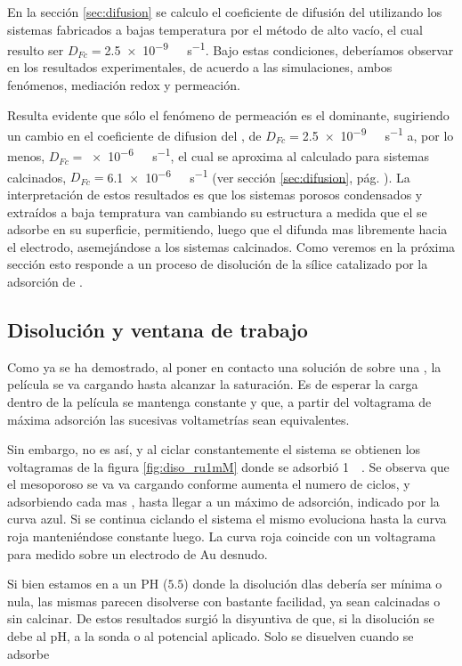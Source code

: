 		En la sección \ref{sec:difusion} se calculo el coeficiente de difusión del \fc\space utilizando los sistemas fabricados a bajas temperatura por el método de alto vacío, el cual resulto ser $D_{Fc}=$\SI{2.5e-9}{\per\Molar\per\second}. Bajo estas condiciones, deberíamos observar en los resultados experimentales, de acuerdo a las simulaciones, ambos fenómenos, mediación redox y permeación.

		Resulta evidente que sólo el fenómeno de permeación es el dominante, sugiriendo un cambio en el coeficiente de difusion del \fc, de $D_{Fc}=$\SI{2.5e-9}{\per\Molar\per\second} a, por lo menos, $D_{Fc}=$\SI{e-6}{\per\Molar\per\second}, el cual se aproxima al calculado para sistemas calcinados,  $D_{Fc}=$\SI{6.1e-6}{\per\Molar\per\second} (ver sección \ref{sec:difusion}, pág. \pageref{sec:difusion}). La interpretación de estos resultados es que los sistemas porosos condensados y extraídos a baja tempratura van cambiando su estructura a medida que el \ru\space se adsorbe en su superficie, permitiendo, luego que el \fc\space difunda mas libremente hacia el electrodo, asemejándose a los sistemas calcinados. Como veremos en la próxima sección esto responde a un proceso de disolución de la sílice catalizado por la adsorción de \aminorutenio.

	\subsection{Disolución y ventana de trabajo}

		Como ya se ha demostrado, al poner en contacto una solución de \ru\space sobre una \pdmF\space, la película se va cargando hasta alcanzar la saturación. Es de esperar la carga dentro de la película se mantenga constante y que, a partir del voltagrama de máxima adsorción las sucesivas voltametrías sean equivalentes.

		Sin embargo, no es así, y al ciclar constantemente el sistema se obtienen los voltagramas de la figura \ref{fig:diso_ru1mM} donde se adsorbió \ru\space \SI{1}{\milli\Molar}. Se observa que el mesoporoso se va va cargando conforme aumenta el numero de ciclos, y adsorbiendo cada mas \ru\space, hasta llegar a un máximo de adsorción, indicado por la curva azul. Si se continua ciclando el sistema el mismo evoluciona hasta la curva roja manteniéndose constante luego. La curva roja coincide con un voltagrama para \ru\space medido sobre un electrodo de Au desnudo. 

		Si bien estamos en a un PH ($5.5$) donde la disolución dlas \pedm\space debería ser mínima o nula, las mismas parecen disolverse con bastante facilidad, ya sean \pdm\space calcinadas o sin calcinar. De estos resultados surgió la disyuntiva de que, si la disolución se debe al pH, a la sonda o al potencial aplicado. Solo se disuelven cuando se adsorbe \ru

